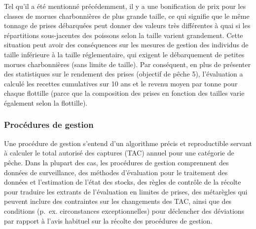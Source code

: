 \documentclass[11pt]{book}
\begin{document}
Tel qu'il a été mentionné précédemment, il y a une bonification de prix pour les classes de morues charbonnières de plus grande taille, ce qui signifie que le même tonnage de prises débarquées peut donner des valeurs très différentes à quai si les répartitions sous-jacentes des poissons selon la taille varient grandement. Cette situation peut avoir des conséquences sur les mesures de gestion des individus de taille inférieure à la taille réglementaire, qui exigent le débarquement de petites morues charbonnières (sans limite de taille). Par conséquent, en plus de présenter des statistiques sur le rendement des prises (objectif de pêche 5), l'évaluation a calculé les recettes cumulatives sur 10 ans et le revenu moyen par tonne pour chaque flottille (parce que la composition des prises en fonction des tailles varie également selon la flottille).

\hypertarget{procuxe9dures-de-gestion}{%
\subsubsection{Procédures de gestion}\label{procuxe9dures-de-gestion}}

Une procédure de gestion s'entend d'un algorithme précis et reproductible servant à calculer le total autorisé des captures (TAC) annuel pour une catégorie de pêche. Dans la plupart des cas, les procédures de gestion comprennent des données de surveillance, des méthodes d'évaluation pour le traitement des données et l'estimation de l'état des stocks, des règles de contrôle de la récolte pour traduire les extrants de l'évaluation en limites de prises, des métarègles qui peuvent inclure des contraintes sur les changements des TAC, ainsi que des conditions (p.~ex. circonstances exceptionnelles) pour déclencher des déviations par rapport à l'avis habituel sur la récolte des procédures de gestion.
\end{document}
